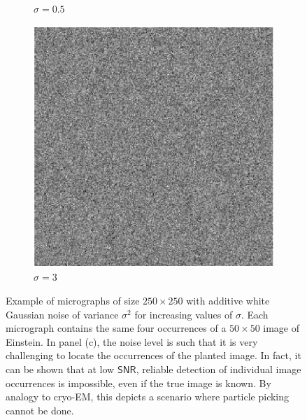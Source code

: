 \documentclass[english,11pt]{article}
\newcommand{\1}{\mathbf{1}}
\newcommand{\TODO}[1]{{\color{red}{[#1]}}}
\numberwithin{equation}{section}
\theoremstyle{plain}
\theoremstyle{definition}
\theoremstyle{remark}
\theoremstyle{plain}
\theoremstyle{remark}
\theoremstyle{plain}
\theoremstyle{plain}
\newcommand{\SNR}{\ensuremath{\textsf{SNR}}}
\begin{document}
\begin{figure}[t]
\begin{subfigure}[h]{0.33\textwidth}
		\caption{$\sigma = 0.5$}
	\end{subfigure}
	\begin{subfigure}[h]{0.33\textwidth}
		\centering
		\includegraphics[scale=0.5]{micrograph_Einstein_example_s3}
		\caption{$\sigma = 3$}
	\end{subfigure}
	\caption{\label{fig:micro_example} Example of micrographs of size $250\times 250$ with additive white Gaussian noise of variance $\sigma^2$ for increasing values of $\sigma$. Each micrograph contains the same four occurrences of a $50 \times 50$ image of Einstein. In panel (c), the noise level is such that it is very challenging to locate the occurrences of the planted image. In fact, it can be shown that at low $\SNR$, reliable detection of individual image occurrences is impossible, even if the true image is known. By analogy to cryo-EM, this depicts a scenario where particle picking cannot be done. \TODO{Do we want to replace with a cryo-EM figure?}}	
\end{figure}
\end{document}
